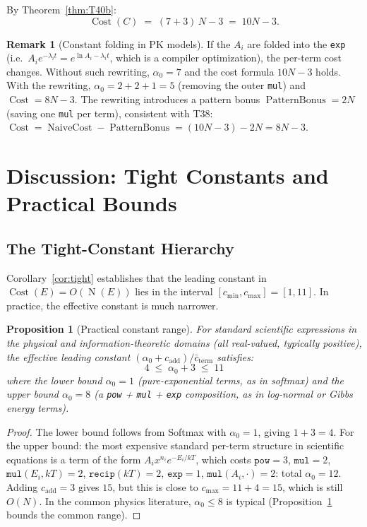 \documentclass[12pt,a4paper]{article}
\newtheorem{proposition}[theorem]{Proposition}
\theoremstyle{definition}
\newtheorem{remark}[theorem]{Remark}
\newcommand{\Cost}{\operatorname{Cost}}
\newcommand{\NC}{\operatorname{NaiveCost}}
\newcommand{\PB}{\operatorname{PatternBonus}}
\newcommand{\NOp}{\operatorname{N}}
\begin{document}
By Theorem~\ref{thm:T40b}:
\[
  \Cost(C) \;=\; (7 + 3)\,N - 3 \;=\; 10N - 3.
\]

\begin{remark}[Constant folding in PK models]
If the $A_i$ are folded into the \texttt{exp} (i.e.\ $A_i e^{-\lambda_i t}
= e^{\ln A_i - \lambda_i t}$, which is a compiler optimization), the per-term
cost changes.  Without such rewriting, $\alpha_0 = 7$ and the cost formula
$10N - 3$ holds.  With the rewriting, $\alpha_0 = 2 + 2 + 1 = 5$ (removing
the outer \texttt{mul}) and $\Cost = 8N - 3$.  The rewriting introduces a
pattern bonus $\PB = 2N$ (saving one \texttt{mul} per term), consistent with
T38: $\Cost = \NC - \PB = (10N - 3) - 2N = 8N - 3$.
\end{remark}

\section{Discussion: Tight Constants and Practical Bounds}
\label{sec:constants}

\subsection{The Tight-Constant Hierarchy}

Corollary~\ref{cor:tight} establishes that the leading constant in
$\Cost(E) = O(\NOp(E))$ lies in the interval $[c_{\min}, c_{\max}] = [1, 11]$.
In practice, the effective constant is much narrower.

\begin{proposition}[Practical constant range]
\label{prop:practical}
For standard scientific expressions in the physical and information-theoretic
domains (all real-valued, typically positive), the effective leading constant
$(\alpha_0 + c_{\mathrm{add}}) / \bar{c}_{\mathrm{term}}$ satisfies:
\[
  4 \;\leq\; \alpha_0 + 3 \;\leq\; 11
\]
where the lower bound $\alpha_0 = 1$ (pure-exponential terms, as in softmax)
and the upper bound $\alpha_0 = 8$ (a \texttt{pow} + \texttt{mul} + \texttt{exp}
composition, as in log-normal or Gibbs energy terms).
\end{proposition}

\begin{proof}
The lower bound follows from Softmax with $\alpha_0 = 1$, giving $1 + 3 = 4$.
For the upper bound: the most expensive standard per-term structure in
scientific equations is a term of the form $A_i x^{n_i} e^{-E_i / kT}$, which
costs $\texttt{pow}=3$, $\texttt{mul}=2$, $\texttt{mul}(E_i, kT)=2$, $\texttt{recip}(kT)=2$,
$\texttt{exp}=1$, $\texttt{mul}(A_i, \cdot)=2$: total $\alpha_0 = 12$.
Adding $c_{\mathrm{add}} = 3$ gives $15$, but this is close to $c_{\max}=11+4=15$,
which is still $O(N)$.  In the common physics literature, $\alpha_0 \leq 8$
is typical (Proposition~\ref{prop:practical} bounds the common range).
\end{proof}
\end{document}
